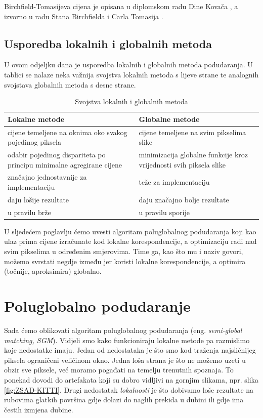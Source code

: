 \documentclass[utf8, zavrsni, numeric]{fer}
\begin{document}
Birchfield-Tomasijeva cijena je opisana u diplomskom radu Dine Kovača \cite{kovac15ms}, a izvorno u radu Stana Birchfielda i Carla Tomasija \cite{birchfield1998depth}.

\section{Usporedba lokalnih i globalnih metoda}
U ovom odjeljku dana je usporedba lokalnih i globalnih metoda podudaranja.
U tablici se nalaze neka važnija svojstva lokalnih metoda s lijeve strane te
analognih svojstava globalnih metoda s desne strane.

\begin{table}[H]
  \caption{Svojstva lokalnih i globalnih metoda}
  \label{tbl:usp_lok_glob}
  \centering
  \begin{tabularx}{\textwidth}{X|X} \hline
    {\bf Lokalne metode} & {\bf Globalne metode} \\
    \hline
    cijene temeljene na oknima oko svakog pojedinog piksela & cijene temeljene na svim pikselima slike \\
    \hline
    odabir pojedinog dispariteta po principu minimalne agregirane cijene & minimizacija globalne funkcije kroz vrijednosti svih piksela slike \\
    \hline
    značajno jednostavnije za implementaciju & teže za implementaciju \\
    \hline
    daju lošije rezultate & daju značajno bolje rezultate \\
    \hline
    u pravilu brže & u pravilu sporije \\
  \end{tabularx}
\end{table}

U sljedećem poglavlju ćemo uvesti algoritam poluglobalnog podudaranja koji kao ulaz prima cijene izračunate kod lokalne korespondencije, a optimizaciju radi nad svim
pikselima u određenim smjerovima. Time ga, kao što mu i naziv govori, možemo svrstati negdje između jer koristi lokalne korespondencije, a optimira (točnije, aproksimira) globalno.


\chapter{Poluglobalno podudaranje}

Sada ćemo oblikovati algoritam poluglobalnog podudaranja (eng. {\sl semi-global matching, SGM}).
Vidjeli smo kako funkcioniraju lokalne metode pa razmislimo koje nedostatke imaju. Jedan od nedostataka je što
smo kod traženja najsličnijeg piksela ograničeni veličinom okno. Jedna loša strana je što ne možemo uzeti u obzir sve piksele, već moramo pogađati na temelju trenutnih spoznaja.
To ponekad dovodi do artefakata koji su dobro vidljivi na gornjim slikama, npr. slika \ref{fig:ZSAD-KITTI}.
Drugi nedostatak {\sl lokalnosti} je što dobivamo loše rezultate na rubovima glatkih površina
gdje dolazi do naglih prekida u dubini ili gdje ima čestih izmjena dubine.
\end{document}
